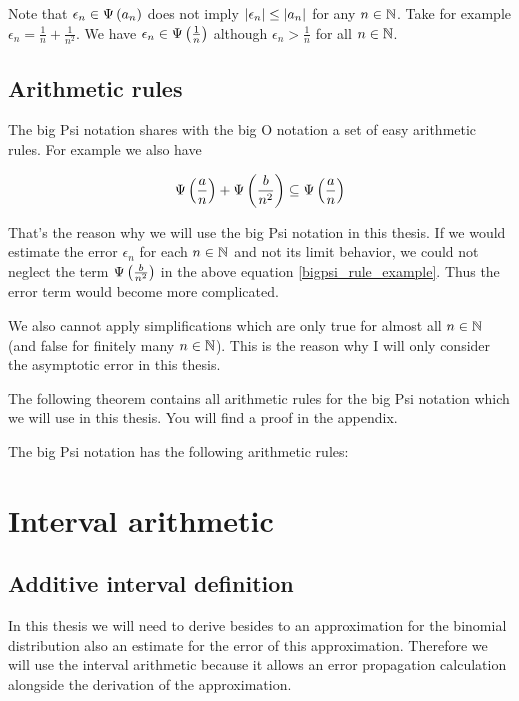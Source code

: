Note that $\epsilon_n\in\Psi\left( {a_n} \right)$ does not imply $\left|{\epsilon_n}\right|\le\left|{a_n}\right|$ for any $n\in\mathbb N$. Take for example $\epsilon_n = \frac 1n + \frac 1{n^2}$. We have $\epsilon_n \in \Psi\left( {\frac 1n} \right)$ although $\epsilon_n > \frac 1n$ for all $n\in\mathbb N$. 

\subsection{Arithmetic rules}

The big Psi notation shares with the big O notation a set of easy arithmetic rules. For example we also have

\begin{align} \label{bigpsi_rule_example}
  \Psi\left( {\frac an} \right)+\Psi\left( {\frac b{n^2}} \right) \subseteq \Psi\left( {\frac an} \right)
\end{align}

That's the reason why we will use the big Psi notation in this thesis. If we would estimate the error $\epsilon_n$ for each $n\in\mathbb N$ and not its limit behavior, we could not neglect the term $\Psi\left( {\frac b{n^2}} \right)$ in the above equation \eqref{bigpsi_rule_example}. Thus the error term would become more complicated.

We also cannot apply simplifications which are only true for almost all $n\in\mathbb N$ (and false for finitely many $n\in\mathbb N$). This is the reason why I will only consider the asymptotic error in this thesis.

The following theorem contains all arithmetic rules for the big Psi notation which we will use in this thesis. You will find a proof in the appendix.

\begin{theorem}
  The big Psi notation has the following arithmetic rules:

\end{theorem}

\section{Interval arithmetic}

\subsection{Additive interval definition}

In this thesis we will need to derive besides to an approximation for the binomial distribution also an estimate for the error of this approximation. Therefore we will use the interval arithmetic  because it allows an error propagation calculation alongside the derivation of the approximation.

